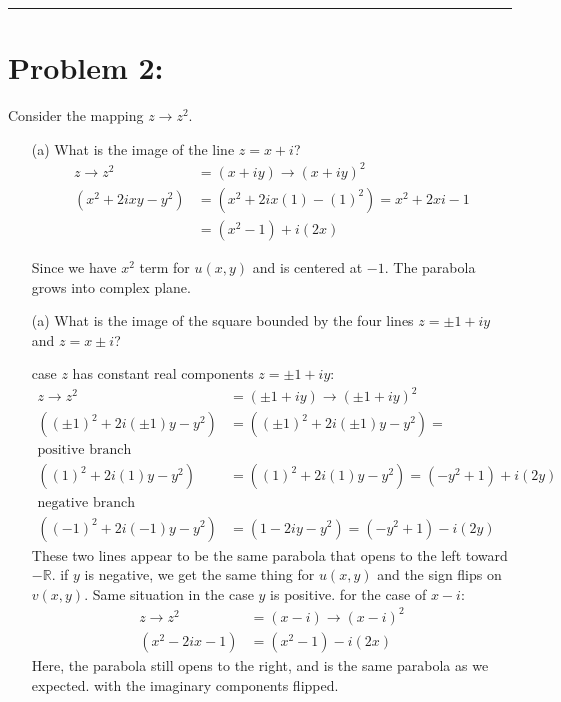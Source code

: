 \documentclass{article}
\begin{document}
\vspace{1cm}
\hrule %

\newpage
\section*{Problem 2:}
Consider the mapping $z \xrightarrow{} z^2$.
\begin{enumerate}
\item[(a)] What is the image of the line $z  = x + i$?
  \begin{align*}
    z \xrightarrow{} z^2  &= (x+iy) \xrightarrow{} (x+iy)^2\\
    (x^2+2ixy-y^2) &= (x^2+2ix(1)-(1)^2) = x^2 + 2xi - 1 \\
    &= (x^2-1) + i(2x)   
  \end{align*}
  
   Since we have $x^2$ term for $u(x,y)$ and is centered at $-1$. The parabola grows into complex plane.
  
\item[(a)] What is the image of the square bounded by the four lines $z  = \pm 1 + iy$ and $z = x \pm i$?

  case $z$ has constant real components $z  = \pm 1 + iy$:
  \begin{align*}
    z \xrightarrow{} z^2  &= (\pm 1+iy) \xrightarrow{} (\pm 1+iy)^2\\
    ((\pm 1)^2+2i(\pm 1)y-y^2) &= ((\pm 1)^2+2i(\pm 1)y-y^2) = \\
    \text{positive branch}&\\
    ((1)^2+2i(1)y-y^2) &= ((1)^2+2i(1)y-y^2) = (-y^2+1)+i(2y) \\
    \text{negative branch}&\\
    ((-1)^2+2i(-1)y-y^2) &= (1-2iy-y^2) = (-y^2+1)-i(2y)
  \end{align*}
  These two lines appear to be the same parabola that opens to the left toward $-\mathbb{R}$. if $y$ is negative, we get the same thing for $u(x,y)$ and the sign flips on $v(x,y)$. Same situation in the case $y$ is positive. 
  for the case of $x-i$:
    \begin{align*}
    z \xrightarrow{} z^2  &= (x-i) \xrightarrow{} (x-i)^2\\
    (x^2-2ix-1) &= (x^2-1) - i(2x)   
    \end{align*}
    Here, the parabola still opens to the right, and is the same parabola as we expected. with the imaginary components flipped.

\end{enumerate}
\end{document}

